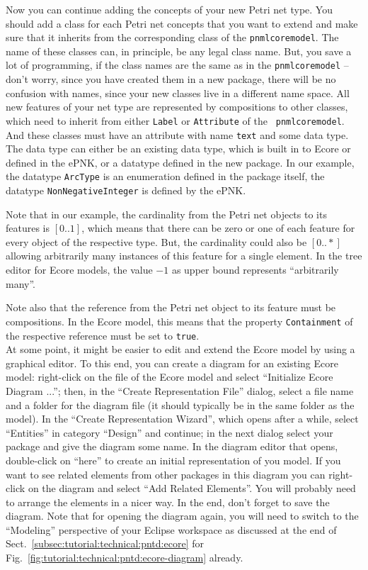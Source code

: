 Now you can continue adding the concepts of your new Petri net type. You should
add a class for each Petri net concepts that you want to extend and make sure
that it inherits from the corresponding class of the {\tt pnmlcoremodel}. The name
of these classes can, in principle, be any legal class name. But, you save a lot
of programming, if the class names are the same as in the  {\tt pnmlcoremodel} --
don't worry, since you have created them in a new package, there will be no
confusion with names, since your new classes live in a different name space. All new features
of your net type are represented by compositions to other classes, which need
to inherit from either {\tt Label} or {\tt Attribute} of the {\tt
pnmlcoremodel}. And these classes must have an attribute with name {\tt text}
and some data type. The data type can either be an existing data type, which
is built in to Ecore or defined in the ePNK, or a datatype defined in the new
package. In our example, the datatype {\tt ArcType} is an enumeration defined
in the package itself, the datatype  {\tt NonNegativeInteger} is defined by the
ePNK.

Note that in our example, the cardinality from the Petri net objects to its
features is $[0..1]$, which means that there can be zero or one of each feature
for every object of the respective type. But, the cardinality could also be $[0..*]$
allowing arbitrarily many instances of this feature for a single element. In the
tree editor for Ecore models, the value $-1$ as upper bound represents
``arbitrarily many''.

Note also that the reference from the Petri net object to its feature must
be compositions. In the Ecore model, this means that the property {\tt Containment}
of the respective reference must be set to {\tt true}.\\

At some point, it might be easier to edit and extend the Ecore model by using
a graphical editor. To this end, you can create a diagram for an existing Ecore
model: right-click on the file of the Ecore model and select ``Initialize Ecore
Diagram ...''; then, in the ``Create Representation File'' dialog, select a file
name and a folder for the diagram file (it should typically be in the same
folder as the model). In the ``Create Representation Wizard'', which opens after
a while, select ``Entities'' in category ``Design'' and continue; in the
next dialog select your package and give the diagram some name. In the diagram
editor that opens, double-click on ``here'' to create an initial representation
of you model. If you want to see related elements from other packages in this
diagram you can right-click on the diagram and select ``Add Related Elements''.
You will probably need to arrange the elements in a nicer way. In the end, don't
forget to save the diagram. Note that for opening the diagram again, you will
need to switch to the ``Modeling'' perspective of your Eclipse workspace as
discussed at the end of Sect.~\ref{subsec:tutorial:technical:pntd:ecore} for
Fig.~\ref{fig:tutorial:technical:pntd:ecore-diagram} already.

